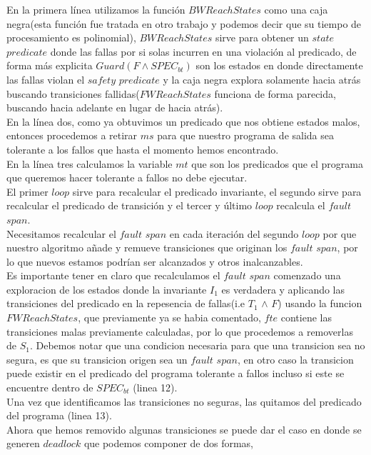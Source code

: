 \documentclass{article}
\begin{document}
\begin{enumerate}
{En la primera línea utilizamos la función $BWReachStates$ como una
caja negra(esta función fue tratada en otro trabajo y podemos decir
que su tiempo de procesamiento es polinomial), $BWReachStates$ sirve 
para obtener un $state$ $predicate$ donde las fallas por si solas
incurren en una violación al
predicado, de forma más explicita $Guard(F \wedge SPEC_{bt})$ son los
estados en donde directamente las fallas violan el $safety$ $predicate$
y la caja negra explora solamente hacia atrás buscando transiciones 
fallidas($FWReachStates$ funciona de forma parecida, buscando hacia
adelante en lugar de hacia atrás).\\
En la línea dos, como ya obtuvimos un predicado que nos obtiene estados
malos, entonces procedemos a retirar $ms$ para que nuestro programa de
salida sea tolerante a los fallos que hasta el momento hemos encontrado.\\
En la línea tres calculamos la variable $mt$ que son los predicados
que el programa que queremos hacer tolerante a fallos no debe ejecutar.\\
El primer $loop$ sirve para recalcular el predicado invariante, el
segundo sirve para recalcular el predicado de transición y el tercer y
último $loop$ recalcula el $fault$ $span$.\\
Necesitamos recalcular el $fault$ $span$ en cada iteración del segundo
$loop$ por que nuestro algoritmo añade y remueve transiciones que
originan los $fault$ $span$, por lo que nuevos estamos podrían ser
alcanzados y otros inalcanzables.\\
Es importante tener en claro que recalculamos el $fault$ $span$
comenzado una exploracion de los estados donde la invariante $I_1$ es
verdadera y aplicando las transiciones del predicado en la repesencia
de fallas(i.e $T_1$ $\wedge$ $F$) usando la funcion $FWReachStates$,
que previamente ya se habia comentado, $fte$ contiene las transiciones
malas previamente calculadas, por lo que procedemos a removerlas de
$S_1$.
Debemos notar que una condicion necesaria para que una transicion sea
no segura, es que su transicion origen sea un $fault$ $span$, en otro
caso la transicion puede existir en el predicado del programa tolerante
a fallos incluso si este se encuentre dentro de $SPEC_{bt}$ (linea 12).\\
Una vez que identificamos las transiciones no seguras, las quitamos
del predicado del programa (linea 13).\\
Ahora que hemos removido algunas transiciones se puede dar el caso en
donde se generen $deadlock$ que podemos componer de dos formas,
}
\end{enumerate}
\end{document}

